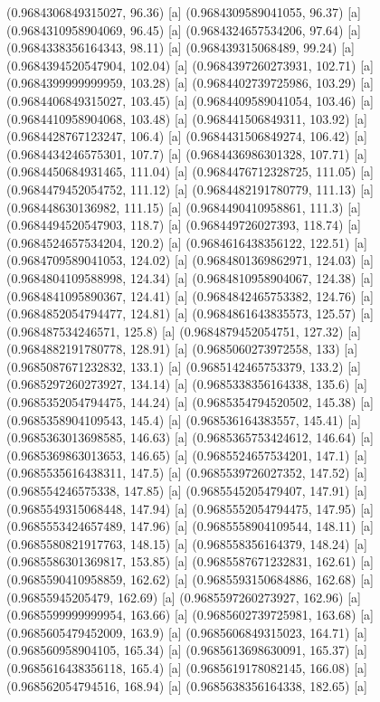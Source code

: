 {{{(0.9684306849315027, 96.36) [a] 
(0.9684309589041055, 96.37) [a] 
(0.9684310958904069, 96.45) [a] 
(0.9684324657534206, 97.64) [a] 
(0.9684338356164343, 98.11) [a] 
(0.968439315068489, 99.24) [a] 
(0.9684394520547904, 102.04) [a] 
(0.9684397260273931, 102.71) [a] 
(0.9684399999999959, 103.28) [a] 
(0.9684402739725986, 103.29) [a] 
(0.9684406849315027, 103.45) [a] 
(0.9684409589041054, 103.46) [a] 
(0.9684410958904068, 103.48) [a] 
(0.968441506849311, 103.92) [a] 
(0.9684428767123247, 106.4) [a] 
(0.9684431506849274, 106.42) [a] 
(0.9684434246575301, 107.7) [a] 
(0.9684436986301328, 107.71) [a] 
(0.9684450684931465, 111.04) [a] 
(0.9684476712328725, 111.05) [a] 
(0.9684479452054752, 111.12) [a] 
(0.9684482191780779, 111.13) [a] 
(0.968448630136982, 111.15) [a] 
(0.9684490410958861, 111.3) [a] 
(0.9684494520547903, 118.7) [a] 
(0.968449726027393, 118.74) [a] 
(0.9684524657534204, 120.2) [a] 
(0.9684616438356122, 122.51) [a] 
(0.9684709589041053, 124.02) [a] 
(0.9684801369862971, 124.03) [a] 
(0.9684804109588998, 124.34) [a] 
(0.9684810958904067, 124.38) [a] 
(0.9684841095890367, 124.41) [a] 
(0.9684842465753382, 124.76) [a] 
(0.9684852054794477, 124.81) [a] 
(0.9684861643835573, 125.57) [a] 
(0.968487534246571, 125.8) [a] 
(0.9684879452054751, 127.32) [a] 
(0.9684882191780778, 128.91) [a] 
(0.9685060273972558, 133) [a] 
(0.9685087671232832, 133.1) [a] 
(0.9685142465753379, 133.2) [a] 
(0.9685297260273927, 134.14) [a] 
(0.9685338356164338, 135.6) [a] 
(0.9685352054794475, 144.24) [a] 
(0.9685354794520502, 145.38) [a] 
(0.9685358904109543, 145.4) [a] 
(0.968536164383557, 145.41) [a] 
(0.9685363013698585, 146.63) [a] 
(0.9685365753424612, 146.64) [a] 
(0.9685369863013653, 146.65) [a] 
(0.9685524657534201, 147.1) [a] 
(0.9685535616438311, 147.5) [a] 
(0.9685539726027352, 147.52) [a] 
(0.968554246575338, 147.85) [a] 
(0.9685545205479407, 147.91) [a] 
(0.9685549315068448, 147.94) [a] 
(0.9685552054794475, 147.95) [a] 
(0.9685553424657489, 147.96) [a] 
(0.9685558904109544, 148.11) [a] 
(0.9685580821917763, 148.15) [a] 
(0.968558356164379, 148.24) [a] 
(0.9685586301369817, 153.85) [a] 
(0.9685587671232831, 162.61) [a] 
(0.9685590410958859, 162.62) [a] 
(0.9685593150684886, 162.68) [a] 
(0.96855945205479, 162.69) [a] 
(0.9685597260273927, 162.96) [a] 
(0.9685599999999954, 163.66) [a] 
(0.9685602739725981, 163.68) [a] 
(0.9685605479452009, 163.9) [a] 
(0.9685606849315023, 164.71) [a] 
(0.968560958904105, 165.34) [a] 
(0.9685613698630091, 165.37) [a] 
(0.9685616438356118, 165.4) [a] 
(0.9685619178082145, 166.08) [a] 
(0.968562054794516, 168.94) [a] 
(0.9685638356164338, 182.65) [a] 
}}}
